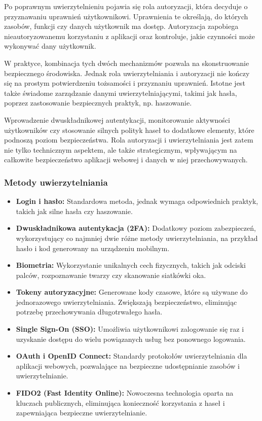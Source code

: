 \documentclass[12pt,twoside]{article}
\begin{document}
Po poprawnym uwierzytelnieniu pojawia się rola autoryzacji, która decyduje o przyznawaniu uprawnień użytkownikowi. Uprawnienia te określają, do których zasobów, funkcji czy danych użytkownik ma dostęp. Autoryzacja zapobiega nieautoryzowanemu korzystaniu z aplikacji oraz kontroluje, jakie czynności może wykonywać dany użytkownik.

W praktyce, kombinacja tych dwóch mechanizmów pozwala na skonstruowanie bezpiecznego środowiska. Jednak rola uwierzytelniania i autoryzacji nie kończy się na prostym potwierdzeniu tożsamości i przyznaniu uprawnień. Istotne jest także świadome zarządzanie danymi uwierzytelniającymi, takimi jak hasła, poprzez zastosowanie bezpiecznych praktyk, np. haszowanie.

Wprowadzenie dwuskładnikowej autentykacji, monitorowanie aktywności użytkowników czy stosowanie silnych polityk haseł to dodatkowe elementy, które podnoszą poziom bezpieczeństwa. Rola autoryzacji i uwierzytelniania jest zatem nie tylko technicznym aspektem, ale także strategicznym, wpływającym na całkowite bezpieczeństwo aplikacji webowej i danych w niej przechowywanych.

\subsubsection{Metody uwierzytelniania}
\begin{itemize}
    \item \textbf{Login i hasło:} Standardowa metoda, jednak wymaga odpowiednich praktyk, takich jak silne hasła czy haszowanie.
    \item \textbf{Dwuskładnikowa autentykacja (2FA):} Dodatkowy poziom zabezpieczeń, wykorzystujący co najmniej dwie różne metody uwierzytelniania, na przykład hasło i kod generowany na urządzeniu mobilnym.
    \item \textbf{Biometria:}  Wykorzystanie unikalnych cech fizycznych, takich jak odciski palców, rozpoznawanie twarzy czy skanowanie siatkówki oka.
    \item \textbf{Tokeny autoryzacyjne:}  Generowane kody czasowe, które są używane do jednorazowego uwierzytelniania. Zwiększają bezpieczeństwo, eliminując potrzebę przechowywania długotrwałego hasła.
    \item \textbf{Single Sign-On (SSO):}  Umożliwia użytkownikowi zalogowanie się raz i uzyskanie dostępu do wielu powiązanych usług bez ponownego logowania.
    \item \textbf{ OAuth i OpenID Connect:} Standardy protokołów uwierzytelniania dla aplikacji webowych, pozwalające na bezpieczne udostępnianie zasobów i uwierzytelnianie.
    \item \textbf{ FIDO2 (Fast Identity Online):  }Nowoczesna technologia oparta na kluczach publicznych, eliminująca konieczność korzystania z haseł i zapewniająca bezpieczne uwierzytelnianie.
\end{itemize}
\end{document}

